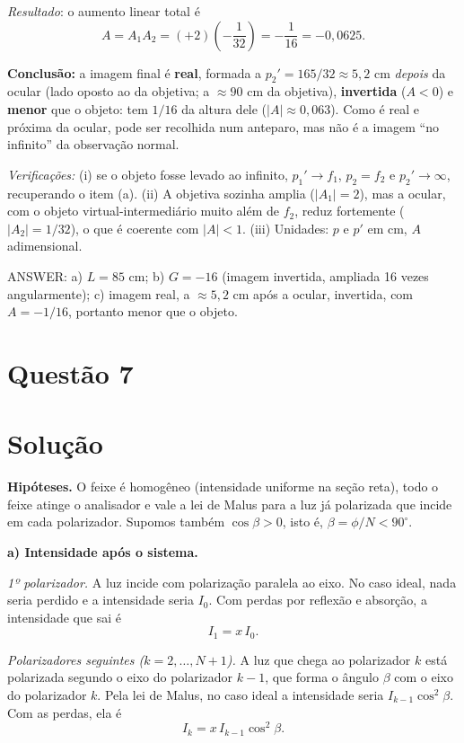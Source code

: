 \documentclass{article}%
\begin{document}
\emph{Resultado}: o aumento linear total é
\[
A=A_1A_2=(+2)\left(-\frac1{32}\right)=-\frac1{16}=-0{,}0625 .
\]

\textbf{Conclusão:} a imagem final é \textbf{real}, formada a $p_2'=165/32\approx5{,}2$ cm \emph{depois} da ocular (lado oposto ao da objetiva; a $\approx 90$ cm da objetiva), \textbf{invertida} ($A<0$) e \textbf{menor} que o objeto: tem $1/16$ da altura dele ($|A|\approx 0{,}063$). Como é real e próxima da ocular, pode ser recolhida num anteparo, mas não é a imagem ``no infinito'' da observação normal.

\emph{Verificações:} (i) se o objeto fosse levado ao infinito, $p_1'\to f_1$, $p_2=f_2$ e $p_2'\to\infty$, recuperando o item (a). (ii) A objetiva sozinha amplia ($|A_1|=2$), mas a ocular, com o objeto virtual-intermediário muito além de $f_2$, reduz fortemente ($|A_2|=1/32$), o que é coerente com $|A|<1$. (iii) Unidades: $p$ e $p'$ em cm, $A$ adimensional.

ANSWER: a) $L=85$ cm; b) $G=-16$ (imagem invertida, ampliada 16 vezes angularmente); c) imagem real, a $\approx 5{,}2$ cm após a ocular, invertida, com $A=-1/16$, portanto menor que o objeto.%
\newpage%
\section*{Questão 7}

\section*{Solução}

\textbf{Hipóteses.} O feixe é homogêneo (intensidade uniforme na seção reta), todo o feixe atinge o analisador e vale a lei de Malus para a luz já polarizada que incide em cada polarizador. Supomos também $\cos\beta>0$, isto é, $\beta=\phi/N<90^\circ$.

\medskip
\textbf{a) Intensidade após o sistema.}

\emph{1º polarizador.} A luz incide com polarização paralela ao eixo. No caso ideal, nada seria perdido e a intensidade seria $I_0$. Com perdas por reflexão e absorção, a intensidade que sai é
\[
I_1 = x\,I_0 .
\]

\emph{Polarizadores seguintes ($k=2,\dots,N+1$).} A luz que chega ao polarizador $k$ está polarizada segundo o eixo do polarizador $k-1$, que forma o ângulo $\beta$ com o eixo do polarizador $k$. Pela lei de Malus, no caso ideal a intensidade seria $I_{k-1}\cos^2\beta$. Com as perdas, ela é
\[
I_k = x\,I_{k-1}\cos^2\beta .
\]
\end{document}
